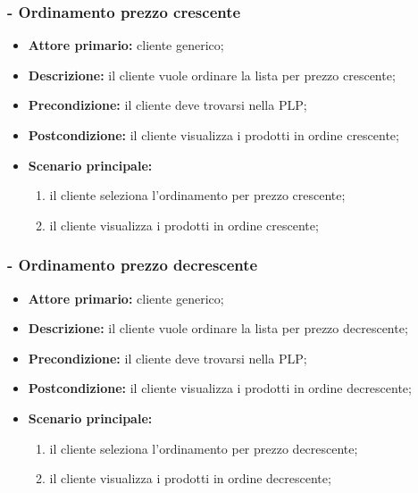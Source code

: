 \stepsubUserCase
\subsubsection{ - Ordinamento prezzo crescente}
\begin{itemize}
    \item \textbf{Attore primario:} cliente generico;
    \item \textbf{Descrizione:} il cliente vuole ordinare la lista per prezzo crescente;
    \item \textbf{Precondizione:} il cliente deve trovarsi nella PLP;
    \item \textbf{Postcondizione:} il cliente visualizza i prodotti in ordine crescente;
    \item \textbf{Scenario principale:}
          \begin{enumerate}
              \item il cliente seleziona l'ordinamento per prezzo crescente;
              \item il cliente visualizza i prodotti in ordine crescente;
          \end{enumerate}
\end{itemize}

\stepsubUserCase
\subsubsection{ - Ordinamento prezzo decrescente}
\begin{itemize}
    \item \textbf{Attore primario:} cliente generico;
    \item \textbf{Descrizione:} il cliente vuole ordinare la lista per prezzo decrescente;
    \item \textbf{Precondizione:} il cliente deve trovarsi nella PLP;
    \item \textbf{Postcondizione:} il cliente visualizza i prodotti in ordine decrescente;
    \item \textbf{Scenario principale:}
          \begin{enumerate}
              \item il cliente seleziona l'ordinamento per prezzo decrescente;
              \item il cliente visualizza i prodotti in ordine decrescente;
          \end{enumerate}
\end{itemize}

